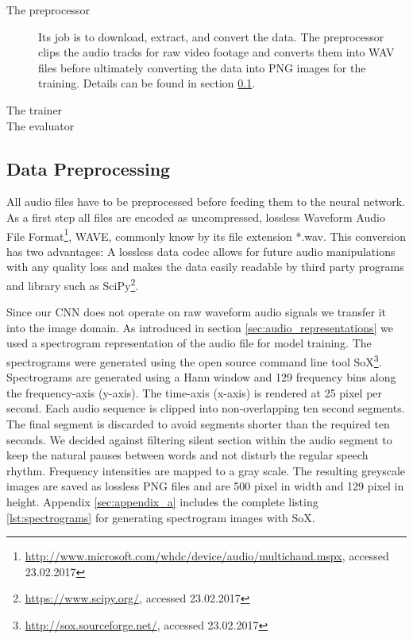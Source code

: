 	\begin{description}
		\item[The preprocessor] Its job is to download, extract, and convert the data. The preprocessor clips the audio tracks for raw video footage and converts them into WAV files before ultimately converting the data into PNG images for the training. Details can be found in section \ref{sec:data_processing}.
		\item[The trainer]
		\item[The evaluator] 
	\end{description}
	

\subsection{Data Preprocessing}
\label{sec:data_processing}
All audio files have to be preprocessed before feeding them to the neural network. As a first step all files are encoded as uncompressed, lossless Waveform Audio File Format\footnote{\url{http://www.microsoft.com/whdc/device/audio/multichaud.mspx}, accessed 23.02.2017}, WAVE, commonly know by its file extension *.wav. This conversion has two advantages: A lossless data codec allows for future audio manipulations with any quality loss and makes the data easily readable by third party programs and library such as SciPy\footnote{\url{https://www.scipy.org/}, accessed 23.02.2017}. 

	Since our CNN does not operate on raw waveform audio signals we transfer it into the image domain. As introduced in section \ref{sec:audio_representations} we used a spectrogram representation of the audio file for model training. The spectrograms were generated using the open source command line tool SoX\footnote{\url{http://sox.sourceforge.net/}, accessed 23.02.2017}. Spectrograms are generated using a Hann window and 129 frequency bins along the frequency-axis (y-axis). The time-axis (x-axis) is rendered at 25 pixel per second. Each audio sequence is clipped into non-overlapping ten second segments. The  final segment is discarded to avoid segments shorter than the required ten seconds. We decided against filtering silent section within the audio segment to keep the natural pauses between words and not disturb the regular speech rhythm. Frequency intensities are mapped to a gray scale. The resulting greyscale images are saved as lossless PNG files and are 500 pixel in width and 129 pixel in height. Appendix \ref{sec:appendix_a} includes the complete listing \ref{lst:spectrograms} for generating spectrogram images with SoX.
	
